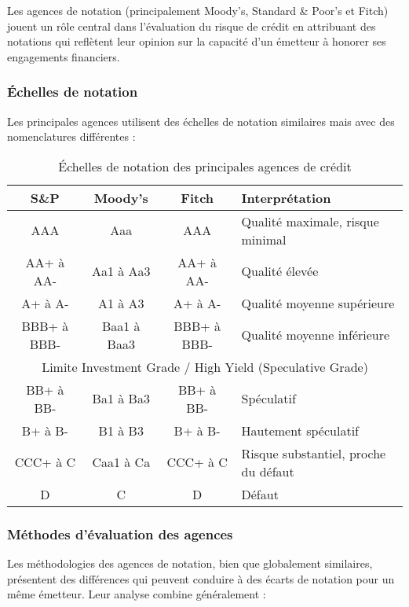Les agences de notation (principalement Moody's, Standard \& Poor's et Fitch) jouent un rôle central dans l'évaluation du risque de crédit en attribuant des notations qui reflètent leur opinion sur la capacité d'un émetteur à honorer ses engagements financiers.

\subsubsection{Échelles de notation}

Les principales agences utilisent des échelles de notation similaires mais avec des nomenclatures différentes :

\begin{table}[h]
\centering
\begin{tabular}{|c|c|c|l|}
\hline
\textbf{S\&P} & \textbf{Moody's} & \textbf{Fitch} & \textbf{Interprétation} \\
\hline
AAA & Aaa & AAA & Qualité maximale, risque minimal \\
AA+ à AA- & Aa1 à Aa3 & AA+ à AA- & Qualité élevée \\
A+ à A- & A1 à A3 & A+ à A- & Qualité moyenne supérieure \\
BBB+ à BBB- & Baa1 à Baa3 & BBB+ à BBB- & Qualité moyenne inférieure \\
\hline
\multicolumn{4}{|c|}{Limite Investment Grade / High Yield (Speculative Grade)} \\
\hline
BB+ à BB- & Ba1 à Ba3 & BB+ à BB- & Spéculatif \\
B+ à B- & B1 à B3 & B+ à B- & Hautement spéculatif \\
CCC+ à C & Caa1 à Ca & CCC+ à C & Risque substantiel, proche du défaut \\
D & C & D & Défaut \\
\hline
\end{tabular}
\caption{Échelles de notation des principales agences de crédit}
\end{table}

\subsubsection{Méthodes d'évaluation des agences}

Les méthodologies des agences de notation, bien que globalement similaires, présentent des différences qui peuvent conduire à des écarts de notation pour un même émetteur. Leur analyse combine généralement :

